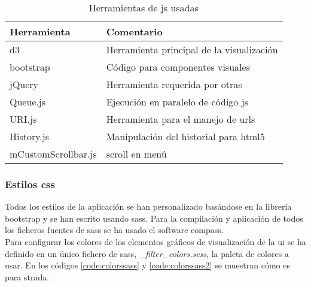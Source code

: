\begin{center}
\begin {table}[H]
	\centering
    \begin{tabular}{ | l l |}
    \hline
    \textbf{Herramienta} & \textbf{Comentario} \\ \hline
    \gls{d3} & Herramienta principal de la visualización  \\ \hline
    \gls{bootstrap} & Código para componentes visuales \\ \hline
    jQuery & Herramienta requerida por otras \\ \hline
    Queue.js & Ejecución en paralelo de código \gls{js} \\ \hline
    URI.js & Herramienta para el manejo de \glspl{url} \\ \hline
    History.js & Manipulación del historial para \gls{html5} \\ \hline
    mCustomScrollbar.js & \Gls{scroll} en menú \\ \hline
    \end{tabular}
    \caption{Herramientas de \gls{js} usadas}
    \label{table:javascriptplug}
  \end{table}
\end{center}


\subsubsection{Estilos \gls{css}}

Todos los estilos de la aplicación se han personalizado basándose en la librería \gls{bootstrap} y se han escrito usando \gls{sass}. Para la compilación y aplicación de todos los ficheros fuentes de \gls{sass} se ha usado el \gls{software} \gls{compass}.\\

Para configurar los colores de los elementos gráficos de visualización de la \gls{ui} se ha definido en un único fichero de  \gls{sass}, \textit{\_filter\_colors.scss}, la paleta de colores a usar. En los códigos \ref{code:colorssass} y \ref{code:colorssass2} se muestran cómo es para \gls{strada}.

